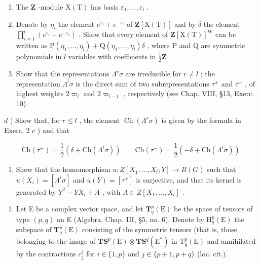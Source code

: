 \begin{enumerate}
\begin{enumerate}
\def\labelenumi{\alph{enumi})}
\item
  The \(\mathbf{Z}\) -module \(\mathrm{X(T)}\) has basis \(\varepsilon_1, \ldots, \varepsilon_l\) .
\item
  Denote by \(\eta_i\) the element \(e^{\varepsilon_i} + e^{-\varepsilon_i}\) of \(\mathbf{Z}[\mathrm{X(T)}]\) and by \(\delta\) the element \(\prod_{i=1}^{l}(e^{\varepsilon_i} - e^{-\varepsilon_i})\) . Show that every element of \(\mathbf{Z}[\mathrm{X(T)}]^{\mathrm{W}}\) can be written as \(\mathrm{P}(\eta_1, \ldots, \eta_l) + \mathrm{Q}(\eta_1, \ldots, \eta_l)\delta\) , where \(\mathrm{P}\) and \(\mathrm{Q}\) are symmetric polynomials in \(l\) variables with coefficients in \(\frac{1}{2}\mathbf{Z}\) .
\item
  Show that the representations \(\Lambda^{r}\sigma\) are irreducible for \(r\neq l\) ; the representation \(\Lambda^{l}\sigma\) is the direct sum of two subrepresentations \(\tau^{+}\) and \(\tau^{-}\) , of highest weights \(2\varpi_{l}\) and \(2\varpi_{l-1}\) , respectively (see Chap. VIII, §13, Exerc. 10).
\end{enumerate}

\(d\) ) Show that, for \(r \leq l\) , the element \(\operatorname{Ch}(\Lambda^r \sigma)\) is given by the formula in Exerc. 2 \(c\) ) and that

\[
\mathrm{Ch} (\tau^ {+}) = \frac {1}{2} (\delta + \mathrm{Ch} (\Lambda ^ {l} \sigma)) \qquad \mathrm{Ch} (\tau^ {-}) = \frac {1}{2} (- \delta + \mathrm{Ch} (\Lambda ^ {l} \sigma)).
\]

\begin{enumerate}
\def\labelenumi{\alph{enumi})}
\setcounter{enumi}{4}
\tightlist
\item
  Show that the homomorphism \(u : Z[X_{1}, \ldots, X_{l}; Y] \to R(G)\) such that \(u(X_{i}) = [\Lambda^{i} \sigma]\) and \(u(Y) = [\tau^{+}]\) is surjective, and that its kernel is generated by \(Y^{2} - YX_{l} + A\) , with \(A \in Z[X_{1}, \ldots, X_{l}]\) .
\end{enumerate}

\begin{enumerate}
\def\labelenumi{\arabic{enumi})}
\setcounter{enumi}{3}
\tightlist
\item
  Let E be a complex vector space, and let \(\mathbf{T}_{q}^{p}(\mathrm{E})\) be the space of tensors of type \((p,q)\) on E (Algebra, Chap. III, §5, no. 6). Denote by \(\mathrm{H}_{q}^{p}(\mathrm{E})\) the subspace of \(\mathbf{T}_{q}^{p}(\mathrm{E})\) consisting of the symmetric tensors (that is, those belonging to the image of \(\mathbf{T}\mathbf{S}^{p}(\mathrm{E})\otimes\mathbf{T}\mathbf{S}^{q}(\mathrm{E}^{*})\) in \(\mathrm{T}_{q}^{p}(\mathrm{E})\) and annihilated by the contractions \(c_{j}^{i}\) for \(i\in\{1,p\}\) and \(j\in\{p+1,p+q\}\) (loc. cit.).
\end{enumerate}


\end{enumerate}
